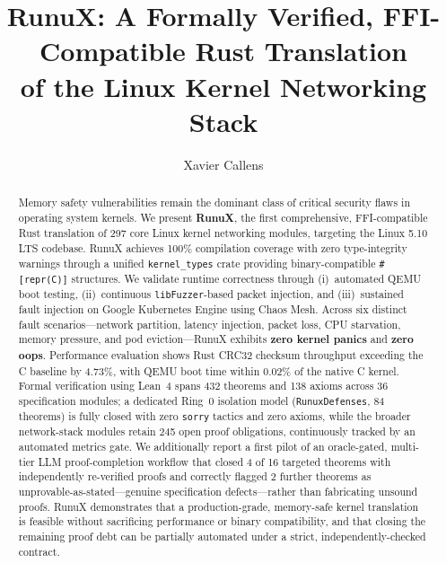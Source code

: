 \documentclass[sigconf,nonacm=false]{acmart}
\begin{document}
\title{RunuX: A Formally Verified, FFI-Compatible Rust Translation\\of the Linux Kernel Networking Stack}

\author{Xavier Callens}

\begin{abstract}
Memory safety vulnerabilities remain the dominant class of critical security flaws in operating system kernels. We present \textbf{RunuX}, the first comprehensive, FFI-compatible Rust translation of 297 core Linux kernel networking modules, targeting the Linux 5.10 LTS codebase. RunuX achieves 100\% compilation coverage with zero type-integrity warnings through a unified \texttt{kernel\_types} crate providing binary-compatible \texttt{\#[repr(C)]} structures. We validate runtime correctness through (i)~automated QEMU boot testing, (ii)~continuous \texttt{libFuzzer}-based packet injection, and (iii)~sustained fault injection on Google Kubernetes Engine using Chaos Mesh. Across six distinct fault scenarios---network partition, latency injection, packet loss, CPU starvation, memory pressure, and pod eviction---RunuX exhibits \textbf{zero kernel panics} and \textbf{zero oops}. Performance evaluation shows Rust CRC32 checksum throughput exceeding the C baseline by 4.73\%, with QEMU boot time within 0.02\% of the native C kernel. Formal verification using Lean~4 spans 432 theorems and 138 axioms across 36 specification modules; a dedicated Ring~0 isolation model (\texttt{RunuxDefenses}, 84 theorems) is fully closed with zero \texttt{sorry} tactics and zero axioms, while the broader network-stack modules retain 245 open proof obligations, continuously tracked by an automated metrics gate. We additionally report a first pilot of an oracle-gated, multi-tier LLM proof-completion workflow that closed 4 of 16 targeted theorems with independently re-verified proofs and correctly flagged 2 further theorems as unprovable-as-stated---genuine specification defects---rather than fabricating unsound proofs. RunuX demonstrates that a production-grade, memory-safe kernel translation is feasible without sacrificing performance or binary compatibility, and that closing the remaining proof debt can be partially automated under a strict, independently-checked contract.
\end{abstract}
\end{document}

